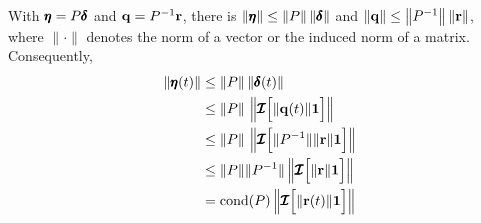     With $\pmb{\eta} = P \pmb{\delta}$ and $\mathbf{q} = P^{-1}\mathbf{r}$, there is $\left\|\pmb{\eta}\right\| \leq \left\|P\right\| \|\pmb{\delta}\|$ and $\|\mathbf{q}\| \leq \left\|P^{-1}\right\| \|\mathbf{r}\|$, where $\|\cdot\|$ denotes the norm of a vector or the induced norm of a matrix. Consequently,
    \begin{align}
        \left\|\pmb{\eta}(t)\right\| &\leq \left\|P\right\| \|\pmb{\delta}(t)\| \\
        &\leq \|P\|\, \left\|\pmb{\mathcal{I}}\Big[\|\mathbf{q}(t)\|\mathbf{1}\Big]\right\|\\
        &\leq \|P\|\, \left\|\pmb{\mathcal{I}}\Big[\|P^{-1}\| \|\mathbf{r}\|\mathbf{1}\Big]\right\|\\
        &\leq \|P\|\|P^{-1}\| \left\|\pmb{\mathcal{I}}\Big[\|\mathbf{r}\|\mathbf{1}\Big]\right\|\\
        &=\mathrm{cond}(P)\left\|\pmb{\mathcal{I}}\Big[\|\mathbf{r}(t)\|\mathbf{1}\Big]\right\| 
    \end{align}
